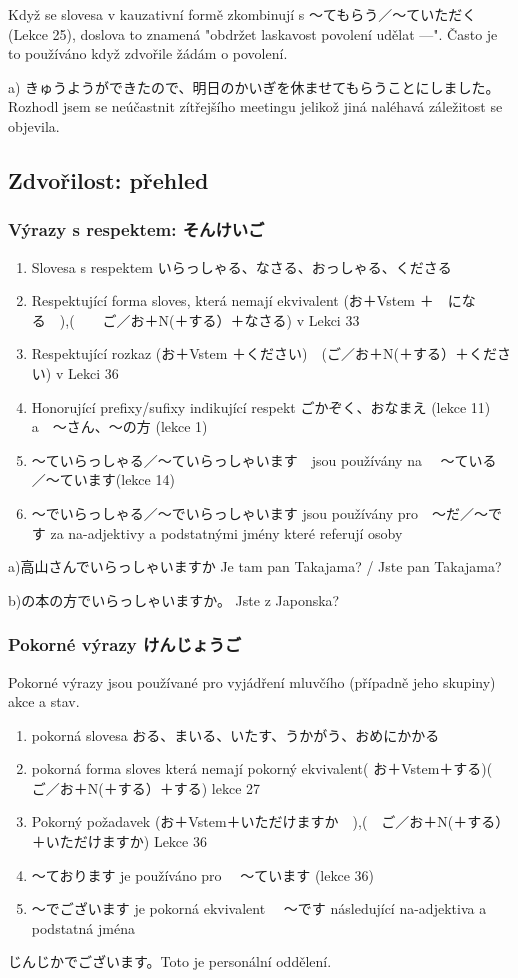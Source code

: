 Když se slovesa v kauzativní formě zkombinují s 〜てもらう／〜ていただく (Lekce 25), doslova to znamená "obdržet laskavost povolení udělat ---". Často je to používáno když zdvořile žádám o povolení. 


a) きゅうようができたので、明日のかいぎを休ませてもらうことにしました。Rozhodl jsem se neúčastnit zítřejšího meetingu jelikož jiná naléhavá záležitost se objevila.


\subsection{Zdvořilost: přehled}

\subsubsection{Výrazy s respektem: そんけいご}

\begin{enumerate}
\item Slovesa s respektem いらっしゃる、なさる、おっしゃる、くださる
\item Respektující forma sloves, která nemají ekvivalent (お＋Vstem ＋　になる　),(　　ご／お＋N(＋する）＋なさる) v Lekci 33
\item Respektující rozkaz (お＋Vstem ＋ください)　(ご／お＋N(＋する）＋ください) v Lekci 36
\item Honorující prefixy/sufixy indikující respekt ごかぞく、おなまえ (lekce 11) a　〜さん、〜の方 (lekce 1)
\item 〜ていらっしゃる／〜ていらっしゃいます　jsou používány na 　〜ている／〜ています(lekce 14)
\item 〜でいらっしゃる／〜でいらっしゃいます jsou používány pro　〜だ／〜です za na-adjektivy a podstatnými jmény které referují osoby
\end{enumerate}

a)高山さんでいらっしゃいますか Je tam pan Takajama? / Jste pan Takajama?

b)の本の方でいらっしゃいますか。 Jste z Japonska?

\subsubsection{Pokorné výrazy けんじょうご}
Pokorné výrazy jsou používané pro vyjádření mluvčího (případně jeho skupiny) akce a stav.
\begin{enumerate}
\item pokorná slovesa おる、まいる、いたす、うかがう、おめにかかる
\item pokorná forma sloves která nemají pokorný ekvivalent( お＋Vstem＋する)(　ご／お＋N(＋する）＋する) lekce 27
\item Pokorný požadavek (お＋Vstem＋いただけますか　),(　ご／お＋N(＋する）＋いただけますか) Lekce 36
\item 〜ております je používáno pro 　〜ています (lekce 36)
\item 〜でございます je pokorná ekvivalent 　〜です následující na-adjektiva a podstatná jména
\end{enumerate}
じんじかでございます。Toto je personální oddělení.


